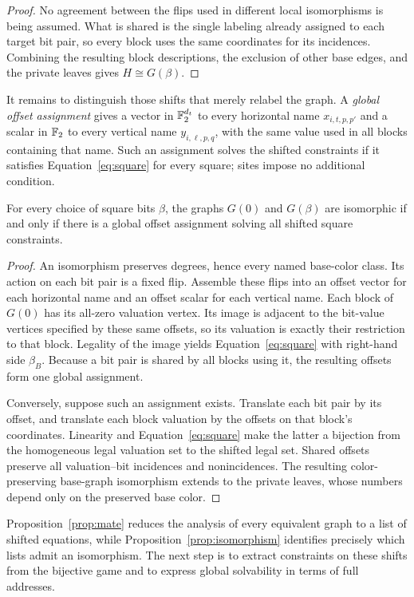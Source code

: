 \begin{proof}
No agreement between the flips used in different local
isomorphisms is being assumed. What is shared is the single
labeling already assigned to each target bit pair, so every
block uses the same coordinates for its incidences. Combining
the resulting block descriptions, the exclusion of other base
edges, and the private leaves gives $H\cong G(\beta)$.
\end{proof}

It remains to distinguish those shifts that merely relabel the
graph. A \emph{global offset assignment} gives a vector in
$\mathbb F_2^{d_t}$ to every horizontal name $x_{i,t,p,p'}$ and a scalar
in $\mathbb F_2$ to every vertical name $y_{i,\ell,p,q}$, with the same
value used in all blocks containing that name. Such an assignment
solves the shifted constraints if it satisfies
Equation~\eqref{eq:square} for every square; sites impose no
additional condition.

\begin{proposition}
\label{prop:isomorphism}
For every choice of square bits $\beta$, the graphs $G(0)$ and
$G(\beta)$ are isomorphic if and only if there is a global offset
assignment solving all shifted square constraints.
\end{proposition}

\begin{proof}
An isomorphism preserves degrees, hence every named base-color
class. Its action on each bit pair is a fixed flip. Assemble
these flips into an offset vector for each horizontal name and
an offset scalar for each vertical name. Each block of $G(0)$
has its all-zero valuation vertex. Its image is adjacent to
the bit-value vertices specified by these same offsets, so
its valuation is exactly their restriction to that block.
Legality of the image yields Equation~\eqref{eq:square} with
right-hand side $\beta_B$. Because a bit pair is shared by all
blocks using it, the resulting offsets form one global assignment.

Conversely, suppose such an assignment exists. Translate each
bit pair by its offset, and translate each block valuation by
the offsets on that block's coordinates. Linearity and
Equation~\eqref{eq:square} make the latter a bijection from the
homogeneous legal valuation set to the shifted legal set.
Shared offsets preserve all valuation--bit incidences and
nonincidences. The resulting color-preserving base-graph
isomorphism extends to the private leaves, whose numbers
depend only on the preserved base color.
\end{proof}

Proposition~\ref{prop:mate} reduces the analysis of every
equivalent graph to a list of shifted equations, while
Proposition~\ref{prop:isomorphism} identifies precisely which
lists admit an isomorphism. The next step is to extract
constraints on these shifts from the bijective game and to
express global solvability in terms of full addresses.
